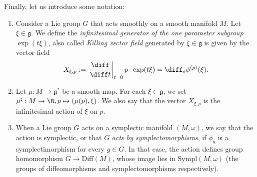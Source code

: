 Finally, let us introduce some notation:
\begin{enumerate}
    \item Consider a Lie group \(G\) that acts smoothly on a smooth manifold \(M\). Let \(\xi \in \mathfrak{g}\). We define the \textit{infinitesimal generator of the one parameter subgroup}\label{infinitesimal generator} \(\exp(t\xi)\), also called \textit{Killing vector field} generated by \(\xi \in \mathfrak{g}\) is given by the vector field
    \begin{equation} \label{def_hat_X}
    X_{\xi, p}:=\left. \frac{\diff}{\diff t} \right|_{t=0} p \cdot \exp(t\xi) = \diff _ e\phi^{(p)}(\xi).
    \end{equation}
    \item Let \(\mu\colon M \to \mathfrak{g}^*\) be a smooth map. For each \(\xi \in \mathfrak{g}\), we set \(\mu^\xi\colon M \to \R, p \mapsto (\mu(p), \xi)\).
    We also say that the vector \(X_{\xi, p}\) is the infinitesimal action of \(\xi\) on \(p\).
    \item When a Lie group \(G\) acts on a symplectic manifold \((M, \omega)\), we say that the action is symplectic, or that \(G\) \textit{acts by symplectomorphisms}, if \(\phi_g\) is a symplectimorphism for every \(g \in G\). In that case, the action defines group homomorphism \(G \to \mathrm{Diff}(M)\), whose image lies in \(\mathrm{Sympl}(M, \omega)\) (the groups of diffeomorphisms and symplectomorphisms respectively). \\
\end{enumerate}

